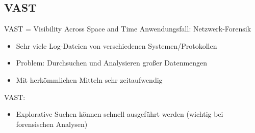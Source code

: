 \documentclass[9pt]{beamer}
\begin{document}
\subsection{VAST}

\begin{frame}{VAST = Visibility Across Space and Time}{}
	Anwendungsfall: Netzwerk-Forensik
	\begin{itemize}
		\item Sehr viele Log-Dateien von verschiedenen Systemen/Protokollen
		\item Problem: Durchsuchen und Analysieren großer Datenmengen
		\item Mit herkömmlichen Mitteln sehr zeitaufwendig
	\end{itemize}
	VAST:
	\begin{itemize}
		\item Explorative Suchen können schnell ausgeführt werden (wichtig bei forensischen Analysen)
	\end{itemize}
\end{frame}
\end{document}
